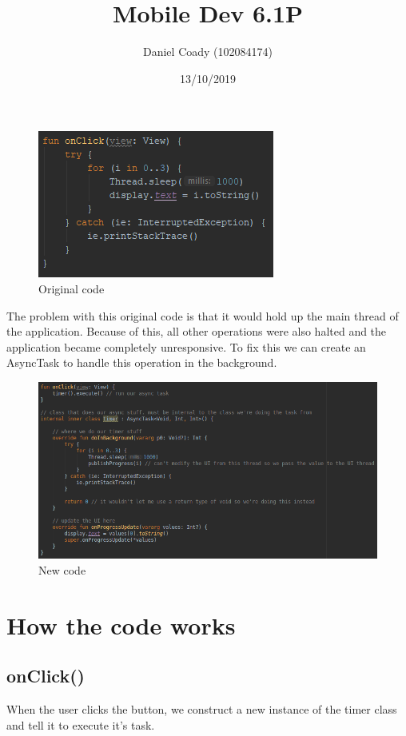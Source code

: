 \documentclass{scrartcl}
\title{Mobile Dev 6.1P}
\author{Daniel Coady (102084174)}
\date{13/10/2019}
\begin{document}
\maketitle

\begin{figure}[h]
    \centering
    \includegraphics{images/screen1.png}
    \caption{Original code}
\end{figure}
The problem with this original code is that it would hold up the main thread of the
application. Because of this, all other operations were also halted and the application
became completely unresponsive. To fix this we can create an AsyncTask to handle this
operation in the background.

\pagebreak

\begin{figure}[h]
    \centering
    \includegraphics[scale=0.52]{images/screen2.png}
    \caption{New code}
\end{figure}

\section*{How the code works}
\subsection*{onClick()}
When the user clicks the button, we construct a new instance of the timer class and tell
it to execute it's task.
\end{document}
